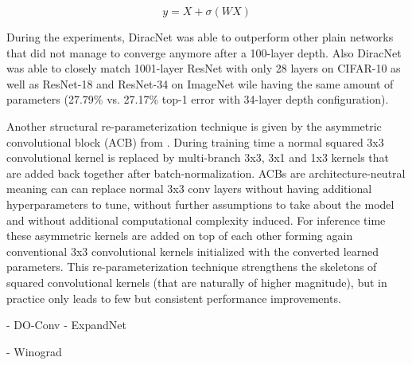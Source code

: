 \begin{equation}
	y = X + \sigma(WX)
\end{equation}

During the experiments, DiracNet was able to outperform other plain networks that did not manage to converge anymore after a 100-layer depth. Also DiracNet was able to closely match 1001-layer ResNet with only 28 layers on CIFAR-10 as well as ResNet-18 and ResNet-34 on ImageNet wile having the same amount of parameters (27.79\% vs. 27.17\% top-1 error with 34-layer depth configuration). 

Another structural re-parameterization technique is given by the asymmetric convolutional block (ACB) from \cite{XiaohanDing.2019}. During training time a normal squared 3x3 convolutional kernel is replaced by multi-branch 3x3, 3x1 and 1x3 kernels that are added back together after batch-normalization. ACBs are architecture-neutral meaning can can replace normal 3x3 conv layers without having additional hyperparameters to tune, without further assumptions to take about the model and without additional computational complexity induced. For inference time these asymmetric kernels are added on top of each other forming again conventional 3x3 convolutional kernels initialized with the converted learned parameters. This re-parameterization technique strengthens the skeletons of squared convolutional kernels (that are naturally of higher magnitude), but in practice only leads to few but consistent performance improvements.  

- DO-Conv
- ExpandNet

- Winograd